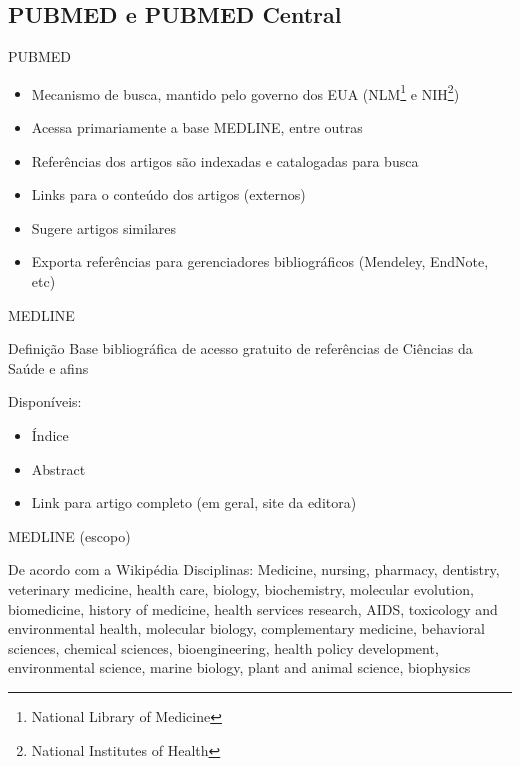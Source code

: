 \documentclass{beamer}
\begin{document}
\subsection{PUBMED e PUBMED Central}

\begin{frame}{PUBMED}
  \begin{itemize}
    \footnotesize
  \item \alert{Mecanismo de busca}, mantido pelo governo dos EUA
    (NLM\footnote{National Library of Medicine} e
    NIH\footnote{National Institutes of Health})
  \item Acessa primariamente a base MEDLINE, entre outras
  \item Referências dos artigos são indexadas e catalogadas para busca
  \item Links para o conteúdo dos artigos (externos)
  \item Sugere artigos similares
  \item Exporta referências para gerenciadores bibliográficos
    (Mendeley, EndNote, etc)
  \end{itemize}
\end{frame}

\begin{frame}{MEDLINE}
  \begin{block}{Definição}
    Base bibliográfica de acesso gratuito de referências de Ciências
    da Saúde e afins
  \end{block}
  Disponíveis:
  \begin{itemize}
    \footnotesize
  \item Índice
  \item Abstract
  \item Link para artigo completo (em geral, site da editora)
  \end{itemize}
\end{frame}

\begin{frame}{MEDLINE (escopo)}
  \begin{block}{De acordo com a Wikipédia}
    \footnotesize
    Disciplinas: Medicine, nursing, pharmacy, dentistry, veterinary
    medicine, health care, biology, biochemistry, molecular evolution,
    biomedicine, history of medicine, health services research, AIDS,
    toxicology and environmental health, molecular biology,
    complementary medicine, behavioral sciences, chemical sciences,
    bioengineering, health policy development, environmental science,
    marine biology, plant and animal science, biophysics
  \end{block}
\end{frame}
\end{document}
